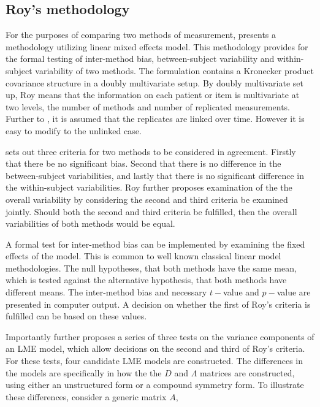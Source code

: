 \documentclass[12pt, a4paper]{report}
\theoremstyle{plain}
\theoremstyle{definition}
\theoremstyle{remark}
\begin{document}
	\subsection{Roy's methodology}
	
	For the purposes of comparing two methods of measurement, \citet{ARoy2009} presents a methodology utilizing linear mixed effects model. This methodology provides for the formal testing of inter-method bias, between-subject variability and within-subject variability of two methods. The formulation contains a Kronecker product covariance structure in a doubly multivariate setup. By doubly multivariate set up, Roy means that the information on each patient or item is multivariate at two levels, the number of methods and number of replicated measurements. Further to \citet{lam}, it is assumed that the replicates are linked over time. However it is easy to modify to the unlinked case.
	
	\citet{ARoy2009} sets out three criteria for two methods to be considered in agreement. Firstly that there be no significant bias. Second that there is no difference in the between-subject variabilities, and lastly that there is no significant difference in the within-subject variabilities. Roy further proposes examination of the the overall variability by considering the second and third criteria be examined jointly. Should both the second and third criteria be fulfilled, then the overall variabilities of both methods would be equal.
	
	A formal test for inter-method bias can be implemented by examining the fixed effects of the model. This is common to well known classical linear model methodologies. The null hypotheses, that both methods have the same mean, which is tested against the alternative hypothesis, that both methods have different means.
	The inter-method bias and necessary $t-$value and $p-$value are presented in computer output. A decision on whether the first of Roy's criteria is fulfilled can be based on these values.
	
	Importantly \citet{ARoy2009} further proposes a series of three tests on the variance components of an LME model, which allow decisions on the second and third of Roy's criteria. For these tests, four candidate LME models are constructed. The differences in the models are specifically in how the the $D$ and $\Lambda$ matrices are constructed, using either an unstructured form or a compound symmetry form. To illustrate these differences, consider a generic matrix $A$,
	
\end{document}
